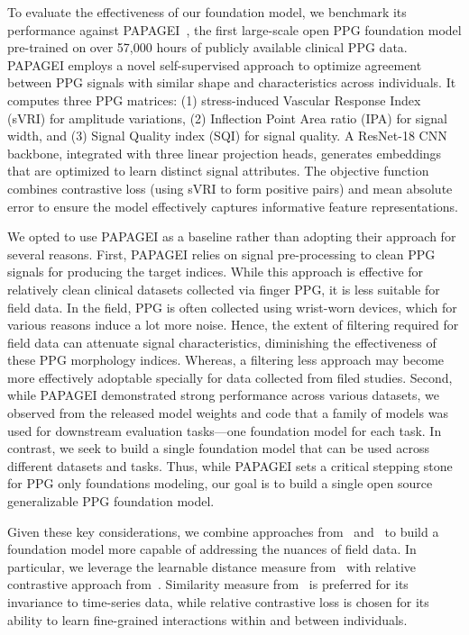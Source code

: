 
To evaluate the effectiveness of our foundation model, we benchmark its performance against PAPAGEI~\cite{pillai2024papagei}, the first large-scale open PPG foundation model pre-trained on over 57,000 hours of publicly available clinical PPG data. PAPAGEI employs a novel self-supervised approach to optimize agreement between PPG signals with similar shape and characteristics across individuals. It computes three PPG matrices: (1) stress-induced Vascular Response Index (sVRI) for amplitude variations, (2) Inflection Point Area ratio (IPA) for signal width, and (3) Signal Quality index (SQI) for signal quality. A ResNet-18 CNN backbone, integrated with three linear projection heads, generates embeddings that are optimized to learn distinct signal attributes. The objective function combines contrastive loss (using sVRI to form positive pairs) and mean absolute error to ensure the model effectively captures informative feature representations. 

We opted to use PAPAGEI as a baseline rather than adopting their approach for several reasons. First, PAPAGEI relies on signal pre-processing to clean PPG signals for producing the target indices. While this approach is effective for relatively clean clinical datasets collected via finger PPG, it is less suitable for field data. In the field, PPG is often collected using wrist-worn devices, which for various reasons induce a lot more noise. Hence, the extent of filtering required for field data can attenuate signal characteristics, diminishing the effectiveness of these PPG morphology indices. Whereas, a filtering less approach may become more effectively adoptable specially for data collected from filed studies. Second, while PAPAGEI demonstrated strong performance across various datasets, we observed from the released model weights and code that a family of models was used for downstream evaluation tasks—one foundation model for each task. In contrast, we seek to build a single foundation model that can be used across different datasets and tasks. Thus, while PAPAGEI sets a critical stepping stone for PPG only foundations modeling, our goal is to build a single open source generalizable PPG foundation model.

Given these key considerations, we combine approaches from~\cite{xurebar} and~\cite{xu2024relcon} to build a foundation model more capable of addressing the nuances of field data. In particular, we leverage the learnable distance measure from~\cite{xurebar} with relative contrastive approach from~\cite{xu2024relcon}. Similarity measure from~\cite{xurebar} is preferred for its invariance to time-series data, while relative contrastive loss is chosen for its ability to learn fine-grained interactions within and between individuals. 



